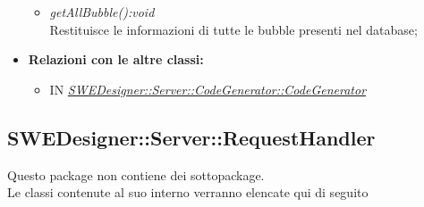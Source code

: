 \documentclass[../DefinizioneDiProdotto.tex]{subfiles}
\begin{document}
\begin{itemize}
\begin{itemize}
					\item \emph{getAllBubble():void} \\ 
					Restituisce le informazioni di tutte le bubble presenti nel database; \\
				\end{itemize}
				
				
				\item \textbf{Relazioni con le altre classi:}
				\begin{itemize}
					\item IN \hyperlink{SWEDesigner::Server::RequestHandler::RequestHandler}{\emph{SWEDesigner::Server::CodeGenerator::CodeGenerator}}
				\end{itemize}	
			\end{itemize}
			
			
			\subsection{SWEDesigner::Server::RequestHandler}
			Questo package non contiene dei sottopackage.\\
			Le classi contenute al suo interno verranno elencate qui di seguito
			
\end{document}
